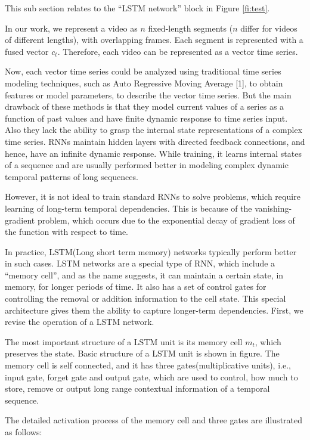 This sub section relates to 
the ``LSTM network'' block in Figure \ref{fi:test}.

In our work, we represent a video as $n$
fixed-length segments ($n$ differ for videos of different lengths),  with overlapping frames.  Each segment
is represented with a fused vector $c_{t}$. Therefore, each video can be represented as a vector time series.


Now, each vector time series could be  analyzed using traditional time series modeling techniques,
such as Auto Regressive Moving Average [1], to obtain features or model parameters, to describe the
vector time series. 
But the main drawback of these methods is that they model current values of a series as a function of past values
and have finite dynamic response to time series input. Also they lack the ability to grasp the internal state 
representations of a complex time series. RNNs maintain hidden layers with directed feedback connections, and hence,
have an infinite dynamic response. While training, it learns internal states of a sequence
and are usually performed better in modeling complex dynamic temporal patterns of long sequences.


However, it is not ideal to train standard RNNs to solve problems,
which require learning of long-term temporal dependencies. This is because of the vanishing-gradient problem, which occurs
due to the exponential decay of gradient loss of the function with respect to time. 

In practice, LSTM(Long short term memory) networks typically perform better in such cases.
LSTM networks are a special type of RNN, which include a ``memory cell'', and as the name suggests,
it can maintain a certain state, in memory, for longer periods of time. 
It also has a set of control gates for controlling the removal or addition information to the cell state.
This special architecture gives them the ability to capture longer-term dependencies. First, we revise the operation of a LSTM
network.

The most important structure of a LSTM unit is its memory cell $m_{t}$, which preserves the state. Basic structure of a LSTM
unit is shown in figure. The memory cell is self connected, and it has three gates(multiplicative units), i.e., input gate, forget gate and 
output gate, which are used to control, how much to store, remove or output long range contextual information of a temporal sequence.

The detailed activation process of the memory cell and three gates are
illustrated as follows:


